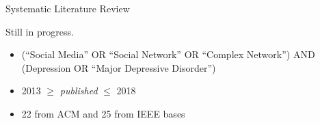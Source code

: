 \documentclass[aspectratio=169,10pt,xcolor={dvipsnames}]{beamer}
\begin{document}
\begin{frame}{Systematic Literature Review}
  \begin{block}{}
    Still in progress.
    \begin{itemize}{}
      \item (“Social Media” OR “Social Network” OR “Complex Network”) AND (Depression OR “Major Depressive Disorder”)
      \item 2013 $\geq$ \textit{published} $\leq$ 2018
      \item 22 from ACM and 25 from IEEE bases
    \end{itemize}
  \end{block}


  \begin{center}
    \begin{table}[h!]
    \centering
      \caption{SLR criteria for inclusion and exclusion.}
      \label{tab:rslCriterias}
    \end{table}
  \end{center}

\end{frame}
\end{document}
